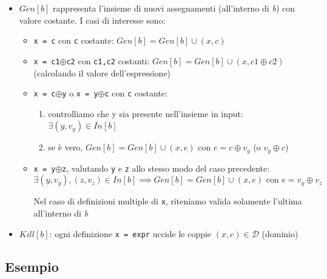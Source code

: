 \documentclass[10pt,a4paper]{article}
\begin{document}
\begin{itemize}
  \item $Gen[b]$ rappresenta l'insieme di nuovi assegnamenti (all'interno di \textit{b}) con valore costante. I casi di interesse sono:
\begin{itemize}
  \item \lstinline|x = c| con \lstinline|c| costante: $Gen[b] = Gen[b] \cup (x,c)$
  \item \lstinline|x = c1|$\oplus$\lstinline|c2| con \lstinline|c1,c2| costanti: $Gen[b] = Gen[b] \cup (x,c1\oplus c2)$ (calcolando il valore dell'espressione)
  \item \lstinline|x = c|$\oplus$\lstinline|y| o \lstinline|x = y|$\oplus$\lstinline|c| con \lstinline|c| costante:
\begin{enumerate}
  \item controlliamo che y sia presente nell'insieme in input: $\exists (y,v_{y}) \in In[b]$
  \item se \`e vero, $Gen[b] = Gen[b] \cup (x,e)$ con $e = c\oplus v_{y}$ (o $v_{y}\oplus c$)
\end{enumerate}
\item \lstinline|x = y|$\oplus$\lstinline|z|, valutando \lstinline|y| e \lstinline|z| allo stesso modo del caso precedente:
  \begin{equation*}
    \exists (y,v_{y}), (z,v_{z})\in In[b] \implies Gen[b] = Gen[b] \cup (x,e) \text{~con~} e=v_{y}\oplus v_{z}
  \end{equation*}

\begin{mdframed}
  Nel caso di definizioni multiple di \lstinline|x|, riteniamo valida solamente l'ultima all'interno di \textit{b}
\end{mdframed}
\end{itemize}
\item $Kill[b]$: ogni definizione \lstinline|x = expr| uccide le coppie $(x,c)\in \mathcal{D}$ (dominio)
\end{itemize}

\subsection{Esempio}
\end{document}
